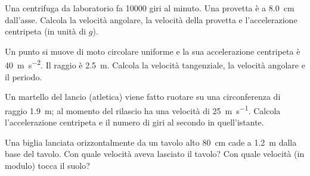 \begin{esercizio}
Una centrifuga da laboratorio fa \SI{10000}{} giri al minuto. Una provetta è a \SI{8,0}{\centi\metre} dall'asse. Calcola la velocità angolare, la velocità della provetta e l'accelerazione centripeta (in unità di $g$).\\
\end{esercizio}

\begin{esercizio}
Un punto si muove di moto circolare uniforme e la sua accelerazione centripeta è \SI{40}{\metre\per\second\squared}. Il raggio è \SI{2,5}{\metre}. Calcola la velocità tangenziale, la velocità angolare e il periodo.\\
\end{esercizio}

\begin{esercizio}
Un martello del lancio (atletica) viene fatto ruotare su una circonferenza di raggio \SI{1,9}{\metre}; al momento del rilascio ha una velocità di \SI{25}{\metre\per\second}. Calcola l'accelerazione centripeta e il numero di giri al secondo in quell'istante.\\
\end{esercizio}

\begin{esercizio}
Una biglia lanciata orizzontalmente da un tavolo alto \SI{80}{\centi\metre} cade a \SI{1,2}{\metre} dalla base del tavolo. Con quale velocità aveva lasciato il tavolo? Con quale velocità (in modulo) tocca il suolo?\\
\end{esercizio}
